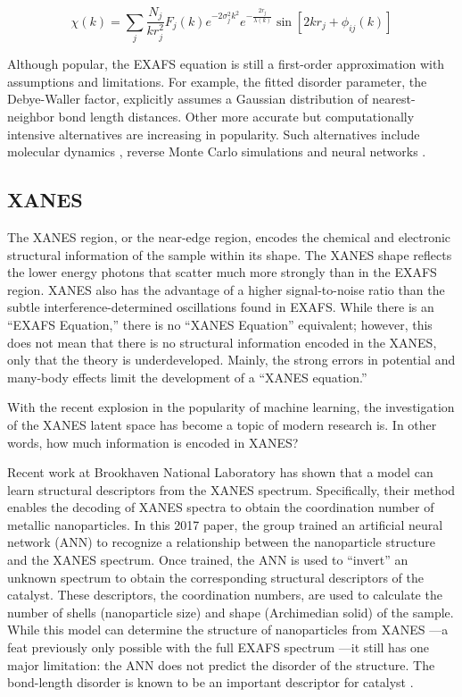 \begin{equation}
    \label{ExafsFormula}
    \chi(k) = \sum_j \frac{N_j}{kr_j^2}F_j(k)e^{-2\sigma_j^2k^2}e^{-\tfrac{2r_j}{\lambda(k)}}\sin[2kr_j + \phi_{ij}(k)]
\end{equation}

Although popular, the EXAFS equation is still a first-order approximation with assumptions and limitations. For example, the fitted disorder parameter, the Debye-Waller factor, explicitly assumes a Gaussian distribution of nearest-neighbor bond length distances. Other more accurate but computationally intensive alternatives are increasing in popularity. Such alternatives include molecular dynamics \cite{mol-dyn-xanes}, reverse Monte Carlo simulations \cite{RMC-xanes} and neural networks \cite{lin2020machine} \cite{timoshenko2018neural}.

\subsection{XANES}
The XANES region, or the near-edge region, encodes the chemical and electronic structural information of the sample within its shape. The XANES shape reflects the lower energy photons that scatter much more strongly than in the EXAFS region. XANES also has the advantage of a higher signal-to-noise ratio than the subtle interference-determined oscillations found in EXAFS. While there is an ``EXAFS Equation,'' there is no ``XANES Equation'' equivalent; however, this does not mean that there is no structural information encoded in the XANES, only that the theory is underdeveloped. Mainly, the strong errors in potential and many-body effects limit the development of a ``XANES equation.'' 

With the recent explosion in the popularity of machine learning, the investigation of the XANES latent space has become a topic of modern research is. In other words, how much information is encoded in XANES?

Recent work at Brookhaven National Laboratory \cite{Timoshenko2017} has shown that a model can learn structural descriptors from the XANES spectrum. Specifically, their method enables the decoding of XANES spectra to obtain the coordination number of metallic nanoparticles. In this 2017 paper, the group trained an artificial neural network (ANN) to recognize a relationship between the nanoparticle structure and the XANES spectrum. Once trained, the ANN is used to ``invert'' an unknown spectrum to obtain the corresponding structural descriptors of the catalyst. These descriptors, the coordination numbers, are used to calculate the number of shells (nanoparticle size) and shape (Archimedian solid) of the sample. While this model can determine the structure of nanoparticles from XANES ---a feat previously only possible with the full EXAFS spectrum ---it still has one major limitation: the ANN does not predict the disorder of the structure. The bond-length disorder is known to be an important descriptor for catalyst \cite{catalyst-strain-dependence} \cite{co-strain-effects}.

